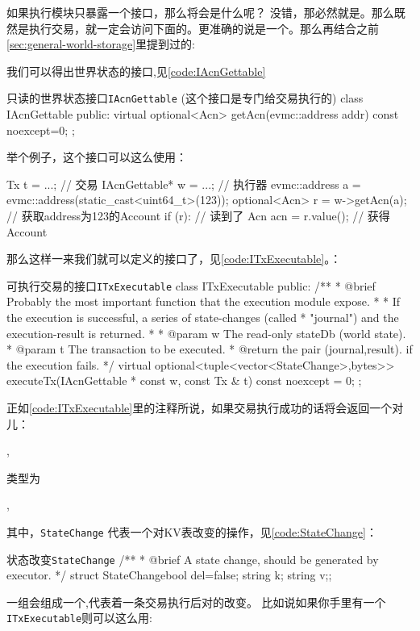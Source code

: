 如果执行模块只暴露一个接口，那么将会是什么呢？ 没错，那必然就是。那么既然是执行交易，就一定会访问下面的。更准确的说是一个。那么再结合之前
\cref{sec:general-world-storage}里提到过的:
\begin{center}
\end{center}
我们可以得出世界状态的接口,见\cref{code:IAcnGettable}
\begin{numberedc}{只读的世界状态接口\texttt{IAcnGettable} (这个接口是专门给交易执行的)}{\label{code:IAcnGettable}}
  class IAcnGettable{
  public:
    virtual optional<Acn> getAcn(evmc::address addr) const noexcept=0;
  };\end{numberedc}
举个例子，这个接口可以这么使用：
\begin{simplec}
Tx t = ...;                     // 交易
IAcnGettable* w = ...;          // 执行器
evmc::address a = evmc::address(static_cast<uint64_t>(123));
optional<Acn> r = w->getAcn(a);          // 获取address为123的Account
if (r):                                  // 读到了
  Acn acn = r.value();                   // 获得Account
\end{simplec}
那么这样一来我们就可以定义的接口了，见\cref{code:ITxExecutable}。：
\begin{numberedc}{可执行交易的接口\texttt{ITxExecutable}}{\label{code:ITxExecutable}}
class ITxExecutable {
public:
  /**
   * @brief Probably the most important function that the execution module expose.
   *
   * If the execution is successful, a series of state-changes (called
   * "journal") and the execution-result is returned.
   *
   * @param w The read-only stateDb (world state).
   * @param t The transaction to be executed.
   * @return the pair (journal,result). {} if the execution fails.
   */
  virtual optional<tuple<vector<StateChange>,bytes>> executeTx(IAcnGettable * const w,
                                                               const Tx & t) const noexcept = 0;
};
\end{numberedc}
正如\cref{code:ITxExecutable}里的注释所说，如果交易执行成功的话将会返回一个对儿：
\begin{center}
   , 
\end{center}
类型为
\begin{center}
   , 
\end{center}
其中，\texttt{StateChange} 代表一个对KV表改变的操作，见\cref{code:StateChange}：
\begin{numberedc}{状态改变\texttt{StateChange}}{\label{code:StateChange}}
  /**
   * @brief A state change, should be generated by executor.
   */
  struct StateChange{bool del=false; string k; string v;};
\end{numberedc}
一组会组成一个,代表着一条交易执行后对的改变。
比如说如果你手里有一个\texttt{ITxExecutable}则可以这么用:

